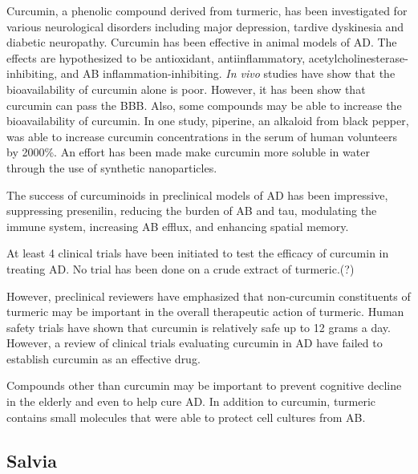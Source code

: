 \documentclass[twocolumn]{article}
\begin{document}
Curcumin, a phenolic compound derived from turmeric,
has been investigated for various neurological disorders including
major depression, tardive dyskinesia and diabetic neuropathy.
\cite{kulkarni2010overview}
Curcumin has been effective in animal models of AD.
\cite{?}
The effects are hypothesized to be antioxidant, antiinflammatory,
acetylcholinesterase-inhibiting,
and AB inflammation-inhibiting.
\cite{?}
\textit{In vivo} studies have show that
the bioavailability of curcumin alone is poor.
\cite{?}
However, it has been show that curcumin can pass the BBB.
Also, some compounds may be able to increase the bioavailability
of curcumin. In one study, piperine, an alkaloid from black pepper,
was able to increase curcumin concentrations in the
serum of human volunteers by 2000\%.
\cite{shoba1998log}
An effort has been made make curcumin more soluble in water
through the use of synthetic nanoparticles.
\cite{mathew2012curcumin}

The success of curcuminoids in preclinical models of AD has been impressive,
suppressing presenilin,
reducing the burden of AB and tau,
modulating the immune system,
increasing AB efflux,
and enhancing spatial memory.
\cite{
yoshida2011turmeric,
shytle2012optimized,
ahmed2010curcuminoids,
ahmed2011comparative,
zhang2006curcuminoids,
villaflores2012effects
}

At least 4 clinical trials have been initiated
to test the efficacy of curcumin in treating AD.
No trial has been done on a crude extract of turmeric.(?)


However, preclinical reviewers have emphasized that non-curcumin
constituents of turmeric may be important in the overall therapeutic
action of turmeric.
\cite{ahmed2014therapeutic}
Human safety trials have shown that curcumin is relatively safe
up to 12 grams a day.
However, a review of clinical trials evaluating curcumin
in AD have failed to establish curcumin as an effective drug.
\cite{hamaguchi2010review}

Compounds other than curcumin may be important to
prevent cognitive decline in the elderly
and even to help cure AD.
In addition to curcumin, turmeric contains small molecules
that were able to protect cell cultures from AB.
\cite{park2002discovery}



\subsection{Salvia}
\end{document}
